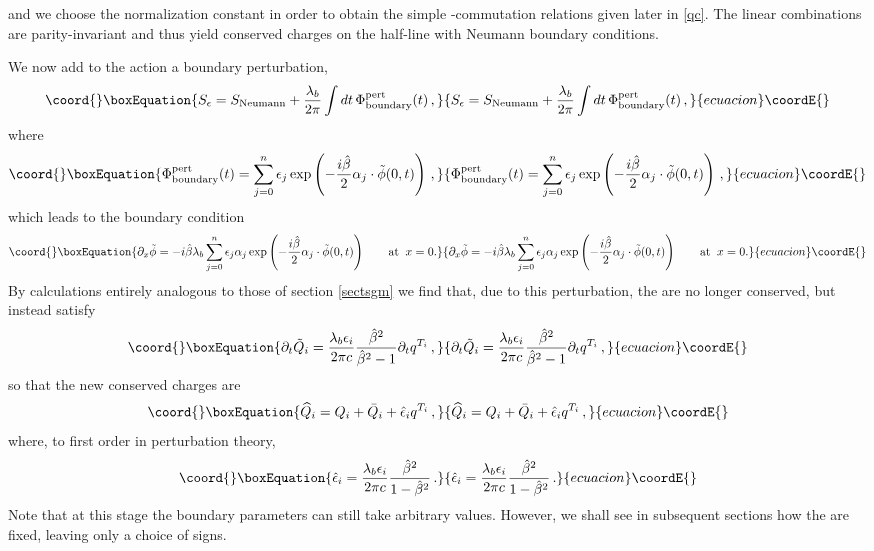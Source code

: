 \documentclass[a4paper,12pt]{article}
\providecommand{\hb}{\hat{\beta}}
\numberwithin{equation}{section}
\begin{document}
and we choose the normalization constant
\coordHE{}  in order to obtain the
simple \coordHE{}-commutation relations given later in \eqref{qc}. The
linear combinations \coordHE{} are
parity-invariant and thus yield conserved charges on the half-line
with Neumann boundary conditions.

We now add to the action a boundary perturbation, \begin{equation}\coord{}\boxEquation{
S_\epsilon = S_{\rm Neumann} +{\lambda_b\over 2\pi}\int dt\,
\Phi^{\rm pert}_{\rm boundary}(t)\,,}{
S_\epsilon = S_{\rm Neumann} +{\lambda_b\over 2\pi}\int dt\,
\Phi^{\rm pert}_{\rm boundary}(t)\,,}{ecuacion}\coordE{}\end{equation} where
\begin{equation}\coord{}\boxEquation{\Phi^{\rm pert}_{\rm boundary}(t) = \sum_{j=0}^n
\epsilon_j \exp\left( -{i\hb\over 2}\alpha_j\cdot\tilde{\phi}(0,t)
\right)\,,}{\Phi^{\rm pert}_{\rm boundary}(t) = \sum_{j=0}^n
\epsilon_j \exp\left( -{i\hb\over 2}\alpha_j\cdot\tilde{\phi}(0,t)
\right)\,,}{ecuacion}\coordE{}\end{equation} which leads to the boundary condition
\begin{equation}\coord{}\boxEquation{
\partial_x\tilde{\phi} = -i\hb\lambda_b \sum_{j=0}^n \epsilon_j
\alpha_j\exp\left( -{i\hb\over 2}\alpha_j\cdot\tilde{\phi}(0,t)
\right)\qquad {\rm at}\;\;x=0.}{
\partial_x\tilde{\phi} = -i\hb\lambda_b \sum_{j=0}^n \epsilon_j
\alpha_j\exp\left( -{i\hb\over 2}\alpha_j\cdot\tilde{\phi}(0,t)
\right)\qquad {\rm at}\;\;x=0.}{ecuacion}\coordE{}\end{equation} By calculations
entirely analogous to those of section \ref{sectsgm} we find that,
due to this perturbation, the \coordHE{} are no longer
conserved, but instead satisfy \begin{equation}\coord{}\boxEquation{ \partial_t
\tilde{Q}_i = {\lambda_b\epsilon_i\over 2\pi c} {\hb^2\over
\hb^2-1}\partial_t q^{T_i}\,,}{ \partial_t
\tilde{Q}_i = {\lambda_b\epsilon_i\over 2\pi c} {\hb^2\over
\hb^2-1}\partial_t q^{T_i}\,,}{ecuacion}\coordE{}\end{equation} so that the new
conserved charges are
\begin{equation}\coord{}\boxEquation{\label{tcc}
  \widehat{Q}_i = Q_i + \bar{Q}_i +
  \hat{\epsilon}_i q^{T_i}\,,
}{\widehat{Q}_i = Q_i + \bar{Q}_i +
  \hat{\epsilon}_i q^{T_i}\,,
}{ecuacion}\coordE{}\end{equation}
where, to first order
in perturbation theory,
\begin{equation}\coord{}\boxEquation{ \hat{\epsilon}_i =
{\lambda_b\epsilon_i\over 2\pi c} {\hb^2\over 1-\hb^2}\,.
}{ \hat{\epsilon}_i =
{\lambda_b\epsilon_i\over 2\pi c} {\hb^2\over 1-\hb^2}\,.
}{ecuacion}\coordE{}\end{equation}
Note that at this stage the boundary parameters \coordHE{}
can still take arbitrary values. However, we shall see in
subsequent sections how the \coordHE{} are fixed,
leaving only a choice of signs.
\end{document}
